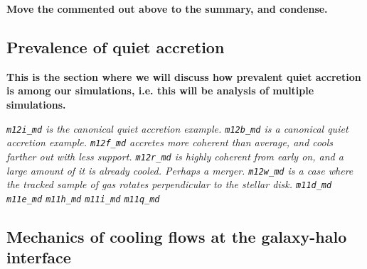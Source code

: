 \documentclass[fleqn,usenatbib]{mnras}
\begin{document}

\textbf{Move the commented out above to the summary, and condense.}

\subsection{Prevalence of quiet accretion}
\label{s: prevalence}

\textbf{
This is the section where we will discuss how prevalent quiet accretion is among our simulations, i.e. this will be analysis of multiple simulations.
}

\textit{
\texttt{m12i\_md} is the canonical quiet accretion example.
\texttt{m12b\_md} is a canonical quiet accretion example.
\texttt{m12f\_md} accretes more coherent than average, and cools farther out with less support.
\texttt{m12r\_md} is highly coherent from early on, and a large amount of it is already cooled.
Perhaps a merger.
\texttt{m12w\_md} is a case where the tracked sample of gas rotates \textit{perpendicular} to the stellar disk.
\texttt{m11d\_md}
\texttt{m11e\_md}
\texttt{m11h\_md}
\texttt{m11i\_md}
\texttt{m11q\_md}
}

\subsection{Mechanics of cooling flows at the galaxy-halo interface}
\label{s: mechanics}
\end{document}
